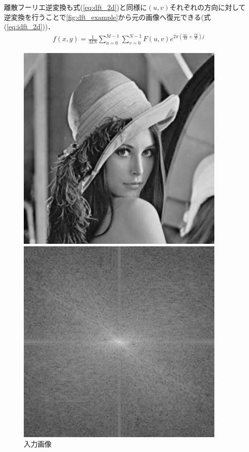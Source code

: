 離散フーリエ逆変換も式(\ref{eq:dft_2d})と同様に$(u, v)$それぞれの方向に対して
逆変換を行うことで\autoref{fig:dft_example}から元の画像へ復元できる(式(\ref{eq:idft_2d}))．
\begin{align}
  f(x, y) = \frac{1}{MN} \sum_{u = 0}^{M-1} \sum_{v = 0}^{N-1} F(u, v) e ^ {2 \pi \left(\frac{ux}{M} + \frac{vy}{N} \right) j} \label{eq:idft_2d}
\end{align}
\iffigure
\begin{figure}[h]
  \centering
  \begin{minipage}{.45\hsize}
    \includegraphics[clip, width=\textwidth]{figure/Lenna.pdf}
    \caption{入力画像}
    \label{fig:input_example}
  \end{minipage}
  \begin{minipage}{.45\hsize}
    \includegraphics[clip, width=\textwidth]{figure/Lenna_dft.pdf}

\end{minipage}
\end{figure}
